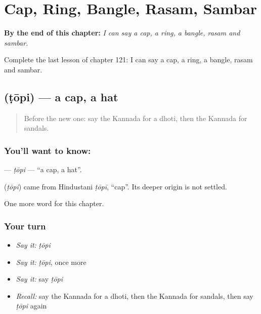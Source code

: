 
\chapter{Cap, Ring, Bangle, Rasam, Sambar}
\label{ch:ka-cap-ring-bangle-rasam-sambar}

\begin{chapteropening}
\textbf{By the end of this chapter:} \emph{I can say a cap, a ring, a bangle, rasam and sambar.}

Complete the last lesson of chapter 121: I can say a cap, a ring, a bangle, rasam and sambar.
\end{chapteropening}

\section[\texorpdfstring{\kn{ಟೋಪಿ} (ṭōpi)}{ಟೋಪಿ (ṭōpi)}]{ (ṭōpi) — a cap, a hat}

\label{lesson:KA-C121-topi}



\begin{quote}
Before the new one: say the Kannada for a dhoti, then the Kannada for sandals.
\end{quote}

\subsection*{You'll want to know: }
\textbf{} — \emph{ṭōpi} — \textquotedblleft{}a cap, a hat\textquotedblright{}.

\begin{cousinweb}
\textbf{} (\emph{ṭōpi}) came from Hindustani \emph{ṭōpī}, \textquotedblleft{}cap\textquotedblright{}. Its deeper origin is not settled.
\end{cousinweb}

\begin{grammarlens}[title={What you've built}]
One more word for this chapter.
\end{grammarlens}

\subsection*{Your turn}
\begin{itemize}
\raggedright
  \item \emph{Say it:} \emph{ṭōpi}
  \item \emph{Say it:} \emph{ṭōpi}, once more
  \item \emph{Say it:} say \emph{ṭōpi}
  \item \emph{Recall:} say the Kannada for a dhoti, then the Kannada for sandals, then say \emph{ṭōpi} again
\end{itemize}

